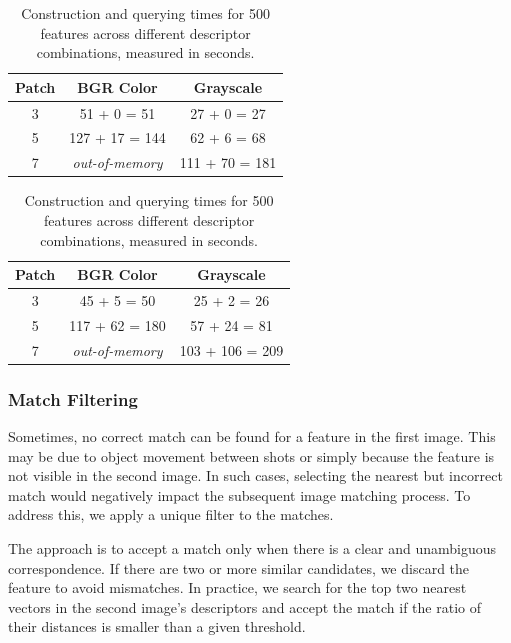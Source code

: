 \begin{table}[htbp]
    \centering
    \begin{minipage}{0.48\textwidth}
        \centering
        \begin{tabular}{|c|c|c|}
            \hline
            \textbf{Patch} & \textbf{BGR Color} & \textbf{Grayscale} \\
            \hline
            3 & 51 + 0 = 51 & 27 + 0 = 27 \\
            \hline
            5 & 127 + 17 = 144 & 62 + 6 = 68 \\
            \hline
            7 & \textit{out-of-memory} & 111 + 70 = 181 \\
            \hline
        \end{tabular}
        \caption*{K-D Tree}
    \end{minipage}
    \hfill 
    \begin{minipage}{0.48\textwidth}
        \centering
        \begin{tabular}{|c|c|c|}
            \hline
            \textbf{Patch} & \textbf{BGR Color} & \textbf{Grayscale} \\
            \hline
            3 & 45 + 5 = 50 & 25 + 2 = 26 \\
            \hline
            5 & 117 + 62 = 180 & 57 + 24 = 81 \\
            \hline
            7 & \textit{out-of-memory} & 103 + 106 = 209 \\
            \hline
        \end{tabular}
        \caption*{Ball Tree}
    \end{minipage}
    \label{tab:match-time}
    \caption{\small Construction and querying times for 500 features across 
    different descriptor combinations, measured in seconds.}
\end{table}

\subsubsection{Match Filtering} \label{match-filtering}
Sometimes, no correct match can be found for a feature in the first image. This 
may be due to object movement between shots or simply because the feature is not 
visible in the second image. In such cases, selecting the nearest but incorrect 
match would negatively impact the subsequent image matching process. To address 
this, we apply a unique filter to the matches.

The approach is to accept a match only when there is a clear and unambiguous 
correspondence. If there are two or more similar candidates, we discard the 
feature to avoid mismatches. In practice, we search for the top two nearest 
vectors in the second image’s descriptors and accept the match if the ratio of 
their distances is smaller than a given threshold. 

